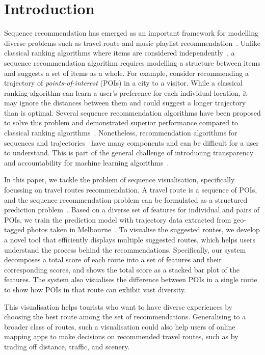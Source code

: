 
\section{Introduction}
Sequence recommendation has emerged as an important framework for modelling diverse problems such as travel route and music playlist recommendation~\cite{chen2017SR}. 
Unlike classical ranking algorithms where items are considered independently~\cite{koren2009matrix},
a sequence recommendation algorithm requires modelling a structure between items and suggests a set of items as a whole. 
For example, consider recommending a trajectory of \emph{points-of-interest} (POIs) in a city to a visitor. 
While a classical ranking algorithm can learn a user's preference for each individual location, it may ignore the distances between them and could suggest a longer trajectory than is optimal. 
Several sequence recommendation algorithms have been proposed to solve this problem and demonstrated superior performance compared to classical ranking algorithms~\cite{ijcai15,chen2017SR}. 
Nonetheless, recommendation algorithms for sequences and trajectories~\cite{chen2016learning,chen2017SR} have many components and can be difficult for a user to understand. This is part of the general challenge of introducing transparency and accountability for machine learning algorithms~\cite{fatml}. 

In this paper, we tackle the problem of sequence visualisation, specifically focussing on travel routes recommendation. 
A travel route is a sequence of POIs, and the sequence recommendation problem can be formulated as a structured prediction problem~\cite{chen2017SR}.
Based on a diverse set of features for individual and pairs of POIs, we train the prediction model with trajectory data extracted from geo-tagged photos taken in Melbourne~\cite{chen2016learning}. 
To visualise the suggested routes, we develop a novel tool that efficiently displays multiple suggested routes, which helps users understand the process behind the recommendations.
Specifically, our system decomposes a total score of each route into a set of features and their corresponding scores, and shows the total score as a stacked bar plot of the features.
The system also visualises the difference between POIs in a single route to show how POIs in that route can exhibit vast diversity. 

This visualisation helps tourists who want to have diverse experiences by choosing the best route among the set of recommendations. Generalising to a broader class of routes, such a visualisation could also help users of online mapping apps to make decisions on recommended travel routes, such as by trading off distance, traffic, and scenery. 
